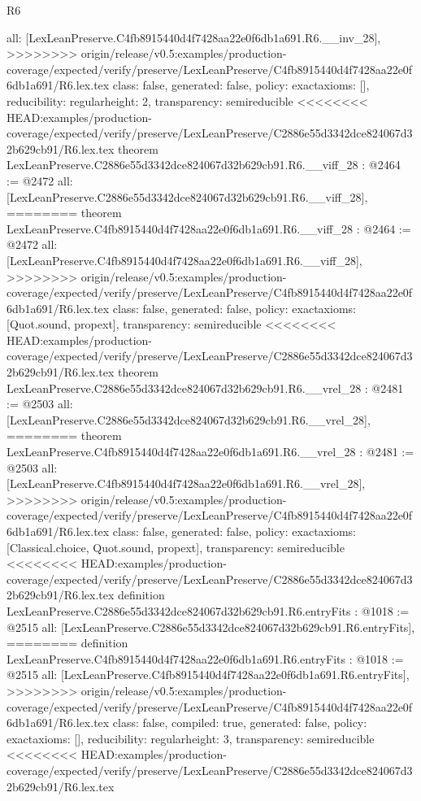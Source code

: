 \begin{lexlean}{R6}
\begin{coremodule}
{{{{{{{{{{{{  all: [LexLeanPreserve.C4fb8915440d4f7428aa22e0f6db1a691.R6.__inv_28],
>>>>>>>> origin/release/v0.5:examples/production-coverage/expected/verify/preserve/LexLeanPreserve/C4fb8915440d4f7428aa22e0f6db1a691/R6.lex.tex
  class: false,
  generated: false,
  policy: exact{axioms: []},
  reducibility: regular{height: 2},
  transparency: semireducible
}
<<<<<<<< HEAD:examples/production-coverage/expected/verify/preserve/LexLeanPreserve/C2886e55d3342dce824067d32b629cb91/R6.lex.tex
theorem LexLeanPreserve.C2886e55d3342dce824067d32b629cb91.R6.__viff_28 : @2464 := @2472 {
  all: [LexLeanPreserve.C2886e55d3342dce824067d32b629cb91.R6.__viff_28],
========
theorem LexLeanPreserve.C4fb8915440d4f7428aa22e0f6db1a691.R6.__viff_28 : @2464 := @2472 {
  all: [LexLeanPreserve.C4fb8915440d4f7428aa22e0f6db1a691.R6.__viff_28],
>>>>>>>> origin/release/v0.5:examples/production-coverage/expected/verify/preserve/LexLeanPreserve/C4fb8915440d4f7428aa22e0f6db1a691/R6.lex.tex
  class: false,
  generated: false,
  policy: exact{axioms: [Quot.sound, propext]},
  transparency: semireducible
}
<<<<<<<< HEAD:examples/production-coverage/expected/verify/preserve/LexLeanPreserve/C2886e55d3342dce824067d32b629cb91/R6.lex.tex
theorem LexLeanPreserve.C2886e55d3342dce824067d32b629cb91.R6.__vrel_28 : @2481 := @2503 {
  all: [LexLeanPreserve.C2886e55d3342dce824067d32b629cb91.R6.__vrel_28],
========
theorem LexLeanPreserve.C4fb8915440d4f7428aa22e0f6db1a691.R6.__vrel_28 : @2481 := @2503 {
  all: [LexLeanPreserve.C4fb8915440d4f7428aa22e0f6db1a691.R6.__vrel_28],
>>>>>>>> origin/release/v0.5:examples/production-coverage/expected/verify/preserve/LexLeanPreserve/C4fb8915440d4f7428aa22e0f6db1a691/R6.lex.tex
  class: false,
  generated: false,
  policy: exact{axioms: [Classical.choice, Quot.sound, propext]},
  transparency: semireducible
}
<<<<<<<< HEAD:examples/production-coverage/expected/verify/preserve/LexLeanPreserve/C2886e55d3342dce824067d32b629cb91/R6.lex.tex
definition LexLeanPreserve.C2886e55d3342dce824067d32b629cb91.R6.entryFits : @1018 := @2515 {
  all: [LexLeanPreserve.C2886e55d3342dce824067d32b629cb91.R6.entryFits],
========
definition LexLeanPreserve.C4fb8915440d4f7428aa22e0f6db1a691.R6.entryFits : @1018 := @2515 {
  all: [LexLeanPreserve.C4fb8915440d4f7428aa22e0f6db1a691.R6.entryFits],
>>>>>>>> origin/release/v0.5:examples/production-coverage/expected/verify/preserve/LexLeanPreserve/C4fb8915440d4f7428aa22e0f6db1a691/R6.lex.tex
  class: false,
  compiled: true,
  generated: false,
  policy: exact{axioms: []},
  reducibility: regular{height: 3},
  transparency: semireducible
}
<<<<<<<< HEAD:examples/production-coverage/expected/verify/preserve/LexLeanPreserve/C2886e55d3342dce824067d32b629cb91/R6.lex.tex
}}}}}}}}}}}}}}
\end{coremodule}
\end{lexlean}
